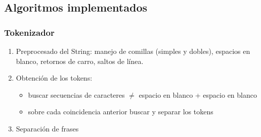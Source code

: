 \documentclass{beamer}
\begin{document}
\subsection{Algoritmos implementados}
\begin{frame}
\frametitle{Tokenizador}
\begin{enumerate}
\item Preprocesado del String: manejo de comillas (simples y dobles), espacios en blanco, retornos de carro, saltos de línea.
\item Obtención de los tokens: 
\begin{itemize}
\item buscar secuencias de caracteres $\neq$ espacio en blanco + espacio en blanco
\item sobre cada coincidencia anterior buscar y separar los tokens
\end{itemize}
\item Separación de frases
\end{enumerate}
\end{frame}
\end{document}
